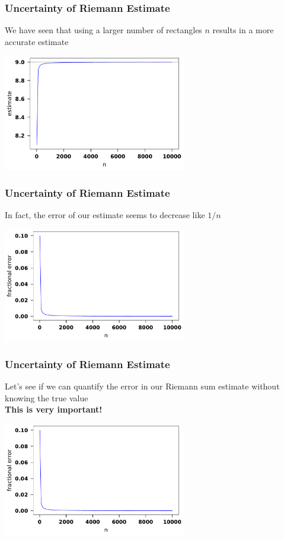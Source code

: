 \documentclass{beamer}
\begin{document}
	\begin{frame}
	\frametitle{Uncertainty of Riemann Estimate}
	We have seen that using a larger number of rectangles $n$ results in a more accurate estimate
	\begin{center}
		\includegraphics[width=8cm]{error1.pdf}
	\end{center}
	\end{frame}


	\begin{frame}
	\frametitle{Uncertainty of Riemann Estimate}
	In fact, the error of our estimate seems to decrease like $1/n$
	\begin{center}
		\includegraphics[width=8cm]{error2.pdf}
	\end{center}
	\end{frame}
	
	\begin{frame}
		\frametitle{Uncertainty of Riemann Estimate}
		Let's see if we can quantify the error in our Riemann sum estimate without knowing the true value\\
		\textbf{This is very important!}
		\begin{center}
			\includegraphics[width=8cm]{error2.pdf}
		\end{center}
	\end{frame}
\end{document}
